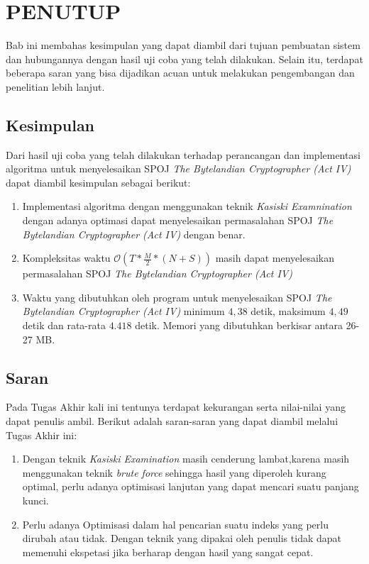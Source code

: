 \chapter{PENUTUP}
  Bab ini membahas kesimpulan yang dapat diambil dari tujuan pembuatan sistem dan hubungannya dengan hasil uji coba yang telah dilakukan. Selain itu, terdapat beberapa saran yang bisa dijadikan acuan untuk melakukan pengembangan dan penelitian lebih lanjut.
  \section{Kesimpulan}
 Dari hasil uji coba yang telah dilakukan terhadap perancangan dan implementasi algoritma untuk menyelesaikan SPOJ \textit{The Bytelandian Cryptographer (Act IV)} dapat diambil kesimpulan sebagai berikut:
 
 \begin{enumerate}
 \item Implementasi algoritma dengan menggunakan teknik \textit{Kasiski Examnination} dengan adanya optimasi dapat menyelesaikan permasalahan SPOJ \textit{The Bytelandian Cryptographer (Act IV)} dengan benar.
 \item Kompleksitas waktu $\mathcal{O}(T*\frac{M}{2}*(N+S))$ masih dapat menyelesaikan permasalahan SPOJ \textit{The Bytelandian Cryptographer (Act IV)}
 \item Waktu yang dibutuhkan oleh program untuk menyelesaikan SPOJ \textit{The Bytelandian Cryptographer (Act IV)} minimum $4,38$ detik, maksimum $4,49$ detik dan rata-rata $4.418$ detik. Memori yang dibutuhkan berkisar antara 26-27 MB.
 \end{enumerate}
  
  \section{Saran}
  Pada Tugas Akhir kali ini tentunya terdapat kekurangan serta nilai-nilai yang dapat penulis ambil. Berikut adalah saran-saran yang dapat diambil melalui Tugas Akhir ini:
  \begin{enumerate}
    \item Dengan teknik \textit{Kasiski Examination} masih cenderung lambat,karena masih menggunakan teknik \textit{brute force} sehingga hasil yang diperoleh kurang optimal, perlu adanya optimisasi lanjutan yang dapat mencari suatu panjang kunci.%
    \item Perlu adanya Optimisasi dalam hal pencarian suatu indeks yang perlu dirubah atau tidak. Dengan teknik yang dipakai oleh penulis tidak dapat memenuhi ekspetasi jika berharap dengan hasil yang sangat cepat.
    
  \end{enumerate}
  
